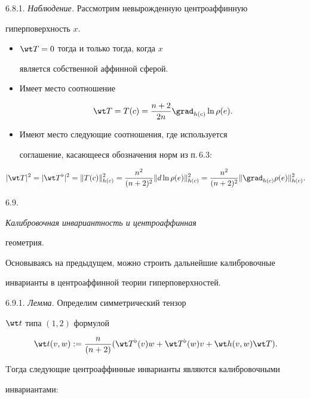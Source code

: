 6.8.1. {\it Наблюдение.} Рассмотрим невырожденную центроаффинную

гиперповерхность $x$.

\begin{itemize}

\item[(i)] $\wt T = 0 $ тогда и только тогда, когда $x$

является собственной аффинной сферой.

\item[(ii)] Имеет место соотношение

$$

\wt T = T(c) = \frac {n+2}{2n} \grad_{h(c)}\ln \rho (e).

$$

\item[(iii)] Имеют место следующие соотношения, где используется

соглашение, касающееся обозначения норм из п.\,6.3:

\end{itemize}

$$

|\wt T|^2 = |\wt T^{\flat}|^2 = \|T(c) \|^2_{h(c)} =

\frac {n^2}{(n+2)^2} \| d \ln \rho (e) \|^2_{h(c)}

= \frac{n^2}{(n+2)^2} \| \grad_{h(c)} \rho (e) \|^2_{h(c)}.

$$



6.9. {\it Калибровочная инвариантность и центроаффинная

геометрия.}

Основываясь на предыдущем, можно строить дальнейшие калибровочные

инварианты в центроаффинной теории гиперповерхностей.

\smallskip



6.9.1. {\it Лемма.} Определим симметрический тензор

$\wt t$ типа $(1,2)$ формулой

$$

\wt t (v,w) := \frac {n}{(n+2)} (\wt T^{\flat} (v)w

+ \wt T^{\flat}(w)v + \wt h (v,w) \wt T).

$$

Tогда следующие центроаффинные инварианты являются калибровочными

инвариантами:


